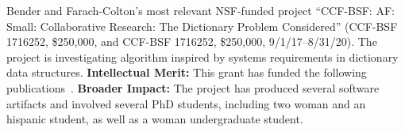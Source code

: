 Bender and Farach-Colton's most relevant NSF-funded project ``CCF-BSF: AF: Small: Collaborative Research: The Dictionary Problem Considered''
(CCF-BSF 1716252, \$250,000, and CCF-BSF 1716252, \$250,000, 9/1/17--8/31/20).
The project is investigating algorithm inspired by systems requirements in dictionary data structures.
{\textbf{Intellectual Merit:}} This grant has funded the following
publications~\cite{AgrawalBeDa20,AgrawalBeFi20,%
ArkinDaGa20,AshkianiFaOw18,AshkianiLiFa18,BenderChDa20,BenderCoFa19,BenderDaJo20,BenderFaGo18,%
BenderFaKu19,BenderGoMe20,BenderKoKu20,ChenMcSi18,ConwayBaJi17b,ConwayFaSh18,ConwayKnJi19,%
DasAgBe20,DasTsDu18,DasTsDu19,BerceaEv20a,BerceaEv20b,%
ZhanCoJi18,ZhanJaPo18,ZhanJaPo18,Mayer18,Pandey19,PandeyAlBe18,PandeyBeJo17a,%
PandeyBeJo17b,PandeyBeJo17c,PandeyBeJo18,Singh18,SinghMaBe20,%
JavanmardGaDa19PPoPP,%
JavanmardGaDa19DISC,%
GoswamiMeMe18,%
GeilFaOw18,PandeySiBe20,%
EvenMeRa18,ConwayFaSh18,AwadAsJo19,BenderFiGi19,Farach-ColtonLiTs18,BenderKoPe18}.
\textbf{Broader Impact:} The project has produced several software artifacts and involved several PhD students, including two woman and an hispanic student, as well as a woman undergraduate student.